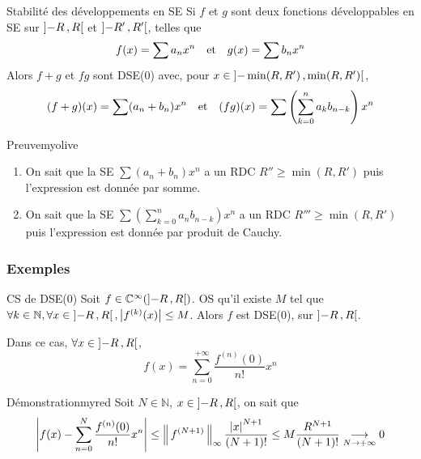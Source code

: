     \begin{prop}{Stabilité des développements en SE}{}
        Si $f$ et $g$ sont deux fonctions développables en SE sur $\left] -R \, , R \right[$ et $\left] -R' \, , R' \right[$, telles que 
        \[ f(x) = \sum a_n x^n \quad \text{et} \quad g(x) = \sum b_n x^n \]   
        Alors $f+g$ et $fg$ sont DSE(0) avec, pour $x \in \left] -\min(R,R') \, , \min(R,R') \right[$,
        \[ (f+g)(x) = \sum (a_n + b_n) x^n \quad \text{et} \quad (fg)(x) = \sum \left(\sum_{k=0}^{n} a_k b_{n-k}\right) x^n \]
    \end{prop}

    \begin{demo}{Preuve}{myolive}
        \begin{enumerate}
            \item On sait que la SE $\sum (a_n + b_n) x^n$ a un RDC $R'' \geq \min(R,R')$ puis l’expression est donnée par somme.
            \item On sait que la SE $\sum (\sum_{k=0}^{n} a_n b_{n-k})x^n$ a un RDC $R''' \geq \min(R,R')$ puis l’expression est donnée par produit de Cauchy.
        \end{enumerate}
    \end{demo}

    \subsubsection{Exemples} 

    \begin{theo}{CS de DSE(0)}{}
        Soit $f \in \mathbb{C}^{\infty}(\left] -R \, , R \right[)$. OS qu’il existe $M$ tel que $\forall k \in \mathbb{N}, \forall x \in \left] -R \, , R \right[, \left\lvert f^{(k)}(x)\right\rvert \leq M$. Alors $f$ est DSE(0), sur $\left] -R \, , R \right[$. 

        Dans ce cas, $\forall x \in \left] -R \, , R \right[$, 
        \[ f(x) = \sum_{n=0}^{+\infty} \frac{f^{(n)}(0)}{n!} x^n \]   
    \end{theo}

    \begin{demo}{Démonstration}{myred}
        Soit $N \in \mathbb{N}$, $x \in \left] -R \, , R \right[$, on sait que 
        \[ \left\lvert f(x) - \sum_{n=0}^{N} \frac{f^{(n)}(0)}{n!} x^n\right\rvert \leq \left\lVert\,f^{(N+1)}\,\right\rVert_{\infty} \frac{\left\lvert x\right\rvert^{N+1}}{(N+1)!} \leq M \frac{R^{N+1}}{(N+1)!} \underset{N \rightarrow +\infty}{\longrightarrow} 0 \] 
    \end{demo}


